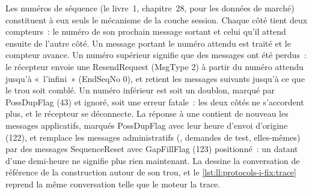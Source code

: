 Les numéros de séquence (le livre~1, chapitre~28, pour les données de marché) constituent à eux seuls le mécanisme de la couche session. Chaque côté tient deux
compteurs~: le numéro de son prochain message sortant et celui qu'il attend ensuite de l'autre côté. Un message portant le
numéro attendu est traité et le compteur avance. Un numéro supérieur signifie que des messages ont été perdus~: le récepteur envoie une
ResendRequest (MsgType 2) à partir du numéro attendu jusqu'à «~l'infini~» (EndSeqNo 0), et retient les messages suivants jusqu'à ce que le trou soit
comblé. Un numéro inférieur est soit un doublon, marqué par PossDupFlag (43) et ignoré, soit une erreur fatale~: les deux côtés ne
s'accordent plus, et le récepteur se déconnecte. La réponse à une  contient de nouveau les messages applicatifs, marqués
PossDupFlag avec leur heure d'envoi d'origine (122), et remplace les messages administratifs (, demandes de test, 
elles-mêmes) par des messages SequenceReset avec GapFillFlag (123) positionné~: un  datant d'une demi-heure ne signifie plus rien
maintenant. La  dessine la conversation de référence de la construction autour de son trou, et
le \cref{lst:ll:protocols-i-fix:trace} reprend la même conversation telle que le moteur la trace.

